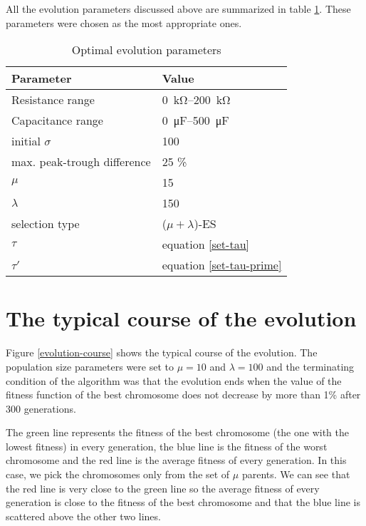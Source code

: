 All the evolution parameters discussed above are summarized in table \ref{evolution-parameters}. These parameters were chosen as the most appropriate ones.

\begin{table}[H]
\centering
\begin{tabular}{@{}ll@{}}
\toprule
    Parameter                   & Value \\ \midrule
    Resistance range            & \SIrange{0}{200}{\kilo\ohm} \\
    Capacitance range           & \SIrange{0}{500}{\micro\farad} \\
    initial $\sigma$            & 100 \\
    max. peak-trough difference & 25 \% \\
    $\mu$                       & 15 \\
    $\lambda$                   & 150 \\
    selection type              & ($\mu + \lambda$)-ES \\
    $\tau$                      & equation \ref{set-tau}\\
    $\tau'$                     & equation \ref{set-tau-prime} \\ \bottomrule
\end{tabular}
\caption{Optimal evolution parameters}
\label{evolution-parameters}
\end{table}

\section{The typical course of the evolution}
Figure \ref{evolution-course} shows the typical course of the evolution. The population size parameters were set to $\mu = 10$ and $\lambda = 100$ and the terminating condition of the algorithm was that the evolution ends when the value of the fitness function of the best chromosome does not decrease by more than 1\% after 300 generations.

The green line represents the fitness of the best chromosome (the one with the lowest fitness) in every generation, the blue line is the fitness of the worst chromosome and the red line is the average fitness of every generation. In this case, we pick the chromosomes only from the set of $\mu$ parents. We can see that the red line is very close to the green line so the average fitness of every generation is close to the fitness of the best chromosome and that the blue line is scattered above the other two lines.

